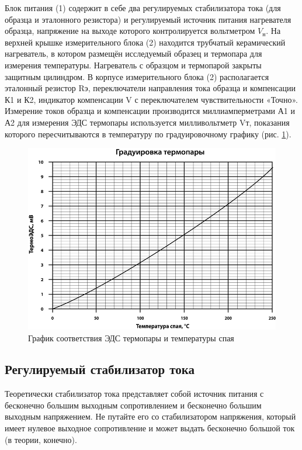 Блок питания (1) содержит в себе два регулируемых стабилизатора тока (для образца и эталонного резистора) и регулируемый
источник питания нагревателя образца, напряжение на выходе которого контролируется вольтметром $V_\text{н}$. На верхней
крышке измерительного блока (2) находится трубчатый керамический нагреватель, в котором размещён исследуемый образец и
термопара для измерения температуры. Нагреватель с образцом и термопарой закрыты защитным цилиндром. В корпусе
измерительного блока (2) располагается эталонный резистор Rэ, переключатели направления тока образца и компенсации К1 и
К2, индикатор компенсации V с переключателем чувствительности «Точно». Измерение токов образца и компенсации
производится миллиамперметрами А1 и А2 для измерения ЭДС термопары используется милливольтметр Vт, показания которого
пересчитываются в температуру по градуировочному графику (рис. \ref{fig:6.3}).

\begin{figure}[h!]
	\centering
	\includegraphics[width = .9\linewidth]{img/grad.jpg}
	\caption{График соответствия ЭДС термопары и температуры спая}
	\label{fig:6.3}
\end{figure}


\subsection{Регулируемый стабилизатор тока}
Теоретически стабилизатор тока представляет собой источник питания с бесконечно большим выходным сопротивлением и
бесконечно большим выходным напряжением. Не путайте его со стабилизатором напряжения, который имеет нулевое выходное
сопротивление и может выдать бесконечно большой ток (в теории, конечно).

